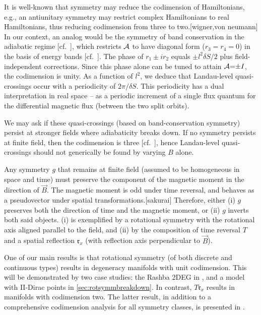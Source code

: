 \documentclass[aps, prb, showpacs, twocolumn, notitlepage, superscriptaddress]{revtex4-1}
\begin{document}

It is well-known that symmetry may reduce the codimension of Hamiltonians, e.g., an antiunitary symmetry may restrict complex Hamiltonians to real Hamiltonians, thus reducing codimension from three to two.[wigner,von neumann] In our context, an analog would be the symmetry of band conservation in the adiabatic regime [cf.\ ], which restricts ${\cal A}$ to have diagonal form  ($r_3{=}r_4{=}0$) in the basis of energy bands [cf.\ ]. The phase of $r_1{\pm}ir_2$ equals ${\pm} l^2\delta S/2$ plus field-independent corrections. Since this  phase alone  can be  tuned to attain ${\cal A}{=}{\pm}I$, the codimension is unity. As a function of $l^2$, we deduce that Landau-level quasi-crossings occur  with a periodicity of $2\pi/\delta S$. This periodicity  has a dual interpretation  in real space -- as a periodic increment of a single flux quantum for  the differential magnetic flux (between the two split orbits).


We may ask if these quasi-crossings (based on band-conservation symmetry) persist at stronger fields where adiabaticity breaks down. If no symmetry persists at finite field, then the codimension is three [cf.\ ], hence Landau-level quasi-crossings should not generically be found by varying $B$ alone.

Any symmetry $g$ that remains at finite field (assumed to be homogeneous in space and time) must preserve the component of the magnetic moment in the direction of  $\vec{B}$. The magnetic moment is odd under time reversal, and behaves as a pseudovector under spatial transformations.[sakurai] Therefore, either (i) $g$  preserves both the direction of time and the magnetic moment, or (ii) $g$ inverts both said objects. (i) is exemplified by a rotational symmetry with the rotational axis aligned parallel to the field, and (ii) by the composition  of time reversal $T$ and a spatial reflection $\mathfrak{r}_x$ (with reflection axis perpendicular to $\vec{B}$). 

One of our main results is that  rotational symmetry (of both discrete and continuous types) results in degeneracy manifolds with unit codimension. This will be demonstrated by two  case studies: the Rashba 2DEG in , and a model with II-Dirac points in \ref{sec:rotsymmbreakdown}. In contrast,  $T\mathfrak{r}_x$ results in manifolds with codimension two. The latter result, in addition to a comprehensive codimension analysis for all symmetry classes, is presented in . 
\end{document}
